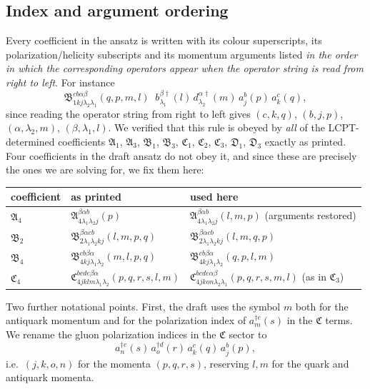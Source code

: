 \documentclass[11pt]{article}
\newcommand{\mf}{\mathfrak}
\newcommand{\dg}{\dagger}
\begin{document}
\subsection{Index and argument ordering}
\label{sec:convention}

Every coefficient in the ansatz is written with its colour superscripts, its
polarization/helicity subscripts and its momentum arguments listed \emph{in the order in which the
corresponding operators appear when the operator string is read from right to left}. For instance
\begin{equation}
\mf B^{cb\alpha\beta}_{1kj\lambda_{2}\lambda_{1}}(q,p,m,l)\;\;
b^{\beta\dg}_{\lambda_{1}}(l)\,d^{\alpha\dg}_{\lambda_{2}}(m)\,
a^{b}_{j}(p)\,a^{c}_{k}(q),
\end{equation}
since reading the operator string from right to left gives
$(c,k,q)$, $(b,j,p)$, $(\alpha,\lambda_2,m)$, $(\beta,\lambda_1,l)$.
We verified that this rule is obeyed by \emph{all} of the LCPT-determined coefficients
$\mf A_1$, $\mf A_3$, $\mf B_1$, $\mf B_3$, $\mf C_1$, $\mf C_2$, $\mf C_3$, $\mf D_1$, $\mf D_3$ exactly as printed.
Four coefficients in the draft ansatz do not obey it, and since these are precisely the ones we
are solving for, we fix them here:

\begin{center}
\begin{tabular}{lll}
\hline
coefficient & as printed & used here\\
\hline
$\mf A_4$ & $\mf A^{\beta\alpha b}_{4\lambda_1\lambda_2 j}(p)$ &
$\mf A^{\beta\alpha b}_{4\lambda_1\lambda_2 j}(l,m,p)$ (arguments restored)\\
$\mf B_2$ & $\mf B^{\beta\alpha cb}_{2\lambda_1\lambda_2kj}(l,m,p,q)$ &
$\mf B^{\beta\alpha cb}_{2\lambda_1\lambda_2kj}(l,m,q,p)$\\
$\mf B_4$ & $\mf B^{cb\beta\alpha}_{4kj\lambda_1\lambda_2}(m,l,p,q)$ &
$\mf B^{cb\beta\alpha}_{4kj\lambda_1\lambda_2}(q,p,l,m)$\\
$\mf C_4$ & $\mf C^{bcde\beta\alpha}_{4jklm\lambda_1\lambda_2}(p,q,r,s,l,m)$ &
$\mf C^{bcde\alpha\beta}_{4jkon\lambda_2\lambda_1}(p,q,r,s,m,l)$ (as in $\mf C_3$)\\
\hline
\end{tabular}
\end{center}

Two further notational points. First, the draft uses the symbol $m$ both for the antiquark
momentum and for the polarization index of $a^{\dg e}_{m}(s)$ in the $\mf C$ terms. We rename the
gluon polarization indices in the $\mf C$ sector to
\begin{equation}
a^{\dg e}_{n}(s)\,a^{\dg d}_{o}(r)\,a^{c}_{k}(q)\,a^{b}_{j}(p),
\end{equation}
i.e.\ $(j,k,o,n)$ for the momenta $(p,q,r,s)$, reserving $l,m$ for the quark and antiquark momenta.
\end{document}
